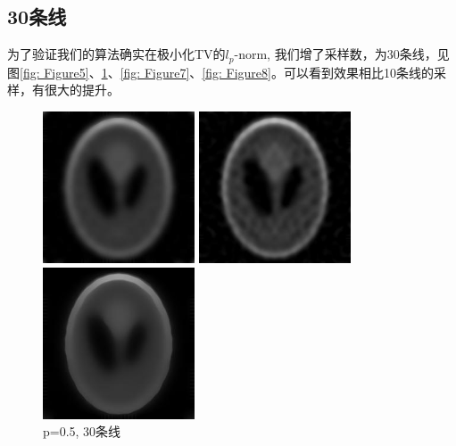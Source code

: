 \documentclass{ctexart}
\begin{document}
\subsection{30条线}
为了验证我们的算法确实在极小化TV的$l_p$-norm, 我们增了采样数，为30条线，见图\ref{fig: Figure5}、\ref{fig: Figure6}、\ref{fig: Figure7}、\ref{fig: Figure8}。可以看到效果相比10条线的采样，有很大的提升。

\begin{figure}[H]
\begin{minipage}[t]{0.4\linewidth}%
\centering     %
\includegraphics[width=4.5cm]{assets/01-30}
\caption{\small p=0.1, 30条线}%
\label{fig: Figure5}
\end{minipage} 
\hfill
\begin{minipage}[t]{0.4\linewidth}
\centering
\includegraphics[width=4.5cm]{assets/05-30}
\caption{\small p=0.5, 30条线}%
\label{fig: Figure6}
\end{minipage}
\begin{minipage}[t]{0.4\linewidth}%
\centering     %
\includegraphics[width=4.5cm]{assets/08-30}

\end{minipage}
\end{figure}
\end{document}
